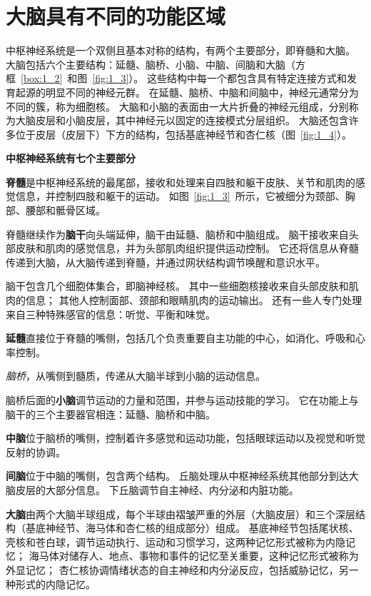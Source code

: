 \section{大脑具有不同的功能区域}

中枢神经系统是一个双侧且基本对称的结构，有两个主要部分，即脊髓和大脑。
大脑包括六个主要结构：延髓、脑桥、小脑、中脑、间脑和大脑（方框~\ref{box:1_2}~和图~\ref{fig:1_3}）。
这些结构中每一个都包含具有特定连接方式和发育起源的明显不同的神经元群。
在延髓、脑桥、中脑和间脑中，神经元通常分为不同的簇，称为细胞核。
大脑和小脑的表面由一大片折叠的神经元组成，分别称为大脑皮层和小脑皮层，其中神经元以固定的连接模式分层组织。
大脑还包含许多位于皮层（皮层下）下方的结构，包括基底神经节和杏仁核（图~\ref{fig:1_4}）。


\begin{proposition}[中枢神经系统的解剖学组织] \label{box:1_2}
	\textbf{中枢神经系统有七个主要部分}
	
	\quad \quad \textbf{脊髓}是中枢神经系统的最尾部，接收和处理来自四肢和躯干皮肤、关节和肌肉的感觉信息，并控制四肢和躯干的运动。
	如图~\ref{fig:1_3}~所示，它被细分为颈部、胸部、腰部和骶骨区域。
	
	\quad \quad 脊髓继续作为\textbf{脑干}向头端延伸，脑干由延髓、脑桥和中脑组成。
	脑干接收来自头部皮肤和肌肉的感觉信息，并为头部肌肉组织提供运动控制。
	它还将信息从脊髓传递到大脑，从大脑传递到脊髓，并通过网状结构调节唤醒和意识水平。
	
	\quad \quad 脑干包含几个细胞体集合，即脑神经核。
	其中一些细胞核接收来自头部皮肤和肌肉的信息；
	其他人控制面部、颈部和眼睛肌肉的运动输出。
	还有一些人专门处理来自三种特殊感官的信息：听觉、平衡和味觉。
	
	\quad \quad \textbf{延髓}直接位于脊髓的嘴侧，包括几个负责重要自主功能的中心，如消化、呼吸和心率控制。
	
	\quad \quad \textit{脑桥}，从嘴侧到髓质，传递从大脑半球到小脑的运动信息。
	
	\quad \quad 脑桥后面的\textbf{小脑}调节运动的力量和范围，并参与运动技能的学习。
	它在功能上与脑干的三个主要器官相连：延髓、脑桥和中脑。
	
	\quad \quad \textbf{中脑}位于脑桥的嘴侧，控制着许多感觉和运动功能，包括眼球运动以及视觉和听觉反射的协调。
	
	\quad \quad \textbf{间脑}位于中脑的嘴侧，包含两个结构。
	丘脑处理从中枢神经系统其他部分到达大脑皮层的大部分信息。
	下丘脑调节自主神经、内分泌和内脏功能。
	
	\quad \quad \textbf{大脑}由两个大脑半球组成，每个半球由褶皱严重的外层（大脑皮层）和三个深层结构（基底神经节、海马体和杏仁核的组成部分）组成。
	基底神经节包括尾状核、壳核和苍白球，调节运动执行、运动和习惯学习，这两种记忆形式被称为内隐记忆；
	海马体对储存人、地点、事物和事件的记忆至关重要，这种记忆形式被称为外显记忆；
	杏仁核协调情绪状态的自主神经和内分泌反应，包括威胁记忆，另一种形式的内隐记忆。
	

\end{proposition}
